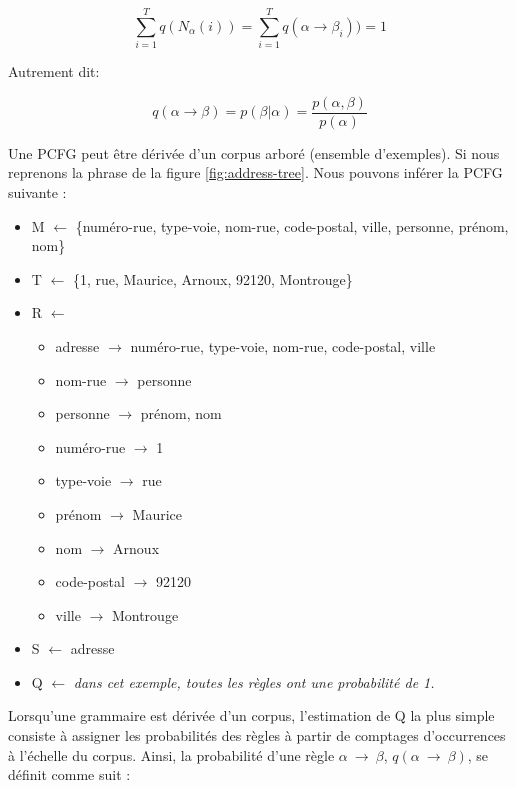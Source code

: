 \documentclass[12pt,a4paper,times,twoside,openright]{report}
\begin{document}
\begin{equation}
\sum_{i=1}^{T} q(N_{\alpha}(i)) = \sum_{i=1}^{T} q(\alpha \rightarrow \beta_{i})) = 1
\end{equation}

Autrement dit:

\begin{equation}
q(\alpha \rightarrow \beta) = p(\beta|\alpha) = \frac{p(\alpha,\beta)}{p(\alpha)}
\end{equation}

Une PCFG peut être dérivée d'un corpus arboré (ensemble d'exemples). Si nous reprenons la phrase de la figure \ref{fig:address-tree}. Nous pouvons inférer la PCFG suivante :
\begin{itemize}
\item M $\leftarrow$ \{numéro-rue, type-voie, nom-rue, code-postal, ville, personne, prénom, nom\}
\item T $\leftarrow$ \{1, rue, Maurice, Arnoux, 92120, Montrouge\}
\item R $\leftarrow$
    \begin{itemize}
    \item adresse $\rightarrow$ numéro-rue, type-voie, nom-rue, code-postal, ville
    \item nom-rue $\rightarrow$ personne
    \item personne $\rightarrow$ prénom, nom
    \item numéro-rue $\rightarrow$ 1
    \item type-voie $\rightarrow$ rue
    \item prénom $\rightarrow$ Maurice
    \item nom $\rightarrow$ Arnoux
    \item code-postal $\rightarrow$ 92120
    \item ville $\rightarrow$ Montrouge
    \end{itemize}
\item S $\leftarrow$ adresse
\item Q $\leftarrow$ \textcolor{green!60!black}{\textit{dans cet exemple, toutes les règles ont une probabilité de 1.}}
\end{itemize}

Lorsqu'une grammaire est dérivée d'un corpus, l'estimation de Q la plus simple consiste à assigner les probabilités des règles à partir de comptages d'occurrences à l'échelle du corpus. Ainsi, la probabilité d'une règle $\alpha\ \rightarrow\ \beta$, $q(\alpha\ \rightarrow\ \beta)$, se définit comme suit :
\end{document}
